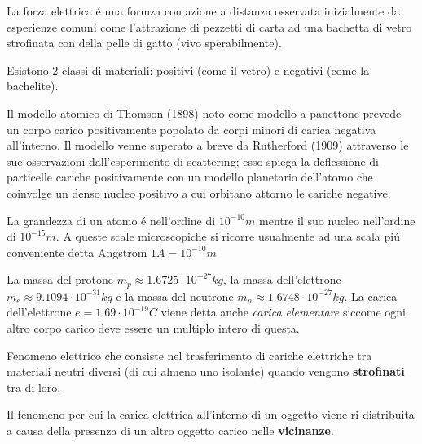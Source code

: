

\usepackage[italian]{babel}




\begin{multicols}{3}
  La forza elettrica \'e una formza con azione a distanza osservata inizialmente
  da esperienze comuni come l'attrazione di pezzetti di carta ad una bachetta di
  vetro strofinata con della pelle di gatto (vivo sperabilmente).

  Esistono 2 classi di materiali: positivi (come il vetro) e negativi
  (come la bachelite).

  Il modello atomico di Thomson (1898) noto come modello a panettone prevede un
  corpo carico positivamente popolato da corpi minori di carica negativa
  all'interno. Il modello venne superato a breve da Rutherford (1909)
  attraverso le sue osservazioni dall'esperimento di scattering; esso spiega
  la deflessione di particelle cariche positivamente con un modello planetario
  dell'atomo che coinvolge un denso nucleo positivo a cui orbitano attorno le
  cariche negative.

  La grandezza di un atomo \'e nell'ordine di $10^{-10}m$ mentre il suo nucleo
  nell'ordine di $10^{-15}m$. A queste scale microscopiche si ricorre usualmente
  ad una scala pi\'u conveniente detta Angstrom $1\mathring{A} = 10^{-10}m$

  La massa del protone $m_p\approx 1.6725\cdot 10^{-27} kg$,
  la massa dell'elettrone $m_e \approx 9.1094 \cdot 10^{-31} kg$ e
  la massa del neutrone $m_n\approx 1.6748\cdot 10^{-27} kg$.
  La carica dell'elettrone  $e = 1.69 \cdot 10^{-19} C$ viene detta anche
  \textit{carica elementare} siccome ogni altro corpo carico deve essere un
  multiplo intero di questa.
  

  Fenomeno elettrico che consiste nel trasferimento di cariche elettriche tra
  materiali neutri diversi (di cui almeno uno isolante) quando vengono
  \textbf{strofinati} tra di loro.

  Il fenomeno per cui la carica elettrica all'interno di un oggetto viene
  ri-distribuita a causa della presenza di un altro oggetto carico nelle
  \textbf{vicinanze}.


\end{multicols}
